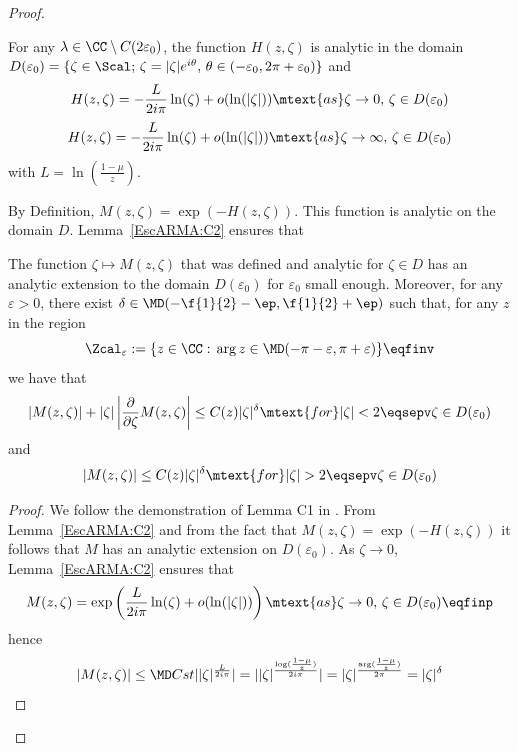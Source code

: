 \begin{proof}
\begin{lemma}\label{EscARMA:C2}For any $\lambda \in \CC \setminus C(2\varepsilon_0)$, the function $H(z,\zeta)$ is analytic in the domain $D(\varepsilon_0) = \{ \zeta \in \Scal; \, \zeta = |\zeta|e^{i\theta}, \, \theta \in (-\varepsilon_0, 2\pi+\varepsilon_0)\}$ and 
$$ H(z, \zeta) = -\frac{L}{2i\pi } \ln(\zeta) + o(\ln(|\zeta|)) \mtext{as} \zeta\to 0,\, \zeta \in D(\varepsilon_0)$$ 
$$ H(z, \zeta) = -\frac{L}{2i\pi } \ln(\zeta) + o(\ln(|\zeta|)) \mtext{as} \zeta\to \infty,\, \zeta \in D(\varepsilon_0)$$ 
with $L = \ln(\frac{1-\mu}{z})$. 
\end{lemma}

By Definition, $ M(z, \zeta) = \exp(-H(z, \zeta))$. This function is analytic on the domain $D$. Lemma~\ref{EscARMA:C2} ensures that

\begin{lemma}\label{prop:cptM}The function $\zeta \mapsto M(z,\zeta)$ that was defined and analytic for $\zeta \in D$ has an analytic extension to the domain $D(\varepsilon_0)$ for $\varepsilon_0$ small enough. Moreover, for any $\varepsilon > 0$, there exist $\delta \in {\MD (-\f{1}{2}-\ep,\f{1}{2}+\ep)}$ such that, for any $z$ in the region
    $$ \Zcal_\varepsilon := \{ z \in \CC :\, \arg z \in {\MD (-\pi-\varepsilon, \pi +\varepsilon)}\} \eqfinv$$ we have that 
    \begin{equation}
        |M(z, \zeta)| + |\zeta|\left| \frac{\partial}{\partial \zeta}M(z,\zeta)\right|
        \leq 
        C(z) |\zeta|^\delta \mtext{for} |\zeta| < 2 \eqsepv \zeta \in D(\varepsilon_0)
    \end{equation}
    and 
    \begin{equation}
        |M(z,\zeta)| \leq C(z)|\zeta|^{\delta} \mtext{for} |\zeta| > 2 \eqsepv \zeta \in D(\varepsilon_0)
    \end{equation}
\end{lemma}
\begin{proof}We follow the demonstration of Lemma C1 in \cite{escobedo2007fundamental}. From Lemma~\ref{EscARMA:C2} and from the fact that $M(z, \zeta) = \exp(-H(z,\zeta))$ it follows that $M$ has an analytic extension on $D(\varepsilon_0)$.
As $\zeta \to 0$, Lemma~\ref{EscARMA:C2} ensures that 
$$ M(z, \zeta) = \exp\left(\frac{L}{2i\pi } \ln(\zeta) + o(\ln(|\zeta|)) \right)  \mtext{as} \zeta\to 0,\, \zeta \in D(\varepsilon_0) \eqfinp$$
hence
$$ \vert {M(z,\zeta)}{} \vert \leq {\MD Cst} \vert {|\zeta|^{\frac{L}{2i\pi}}}\vert=
\vert |\zeta|^{\frac{\log(\frac{1-\mu}{z})}{2i\pi}}\vert = \vert \zeta \vert^{\frac{\arg (\frac{1-\mu}{z})}{2\pi}}=\vert \zeta \vert^\delta
$$
\end{proof}
\end{proof}
